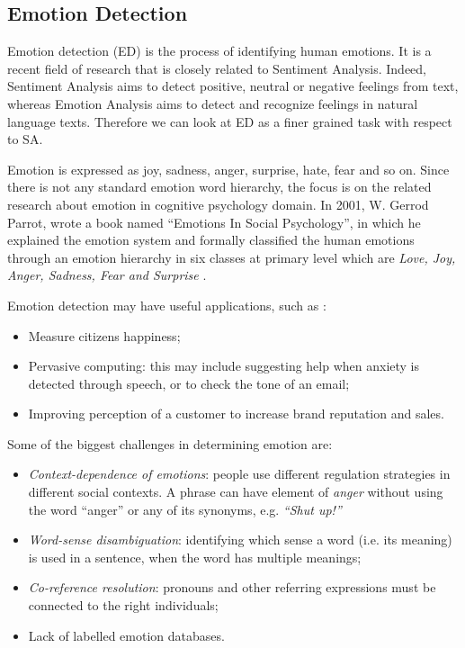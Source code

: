 \subsection{Emotion Detection}

Emotion detection (ED) is the process of identifying human emotions. It is a recent field of research that is closely related to Sentiment Analysis. Indeed, Sentiment Analysis aims to detect positive, neutral or negative feelings from text, whereas Emotion Analysis aims to detect and recognize feelings in natural language texts. Therefore we can look at ED as a finer grained task with respect to SA.\par
Emotion is expressed as joy, sadness, anger, surprise, hate, fear and so on. Since there is not any standard emotion word hierarchy, the focus is on the related research about emotion in cognitive psychology domain. In 2001, W. Gerrod Parrot, wrote a book named ``Emotions In Social Psychology''\cite{Parrott2016}, in which he explained the emotion system and formally classified the human emotions through an emotion hierarchy in six classes at primary level which are \textit{Love, Joy, Anger, Sadness, Fear and Surprise} \cite{edfromtext}.\par

Emotion detection may have useful applications, such as \cite{microsoft}: 
\begin{itemize}
\item Measure citizens happiness;
\item Pervasive computing: this may include suggesting help when anxiety is detected through speech, or to check the tone of an email; 
\item Improving perception of a customer to increase brand reputation and sales. 
\end{itemize}

Some of the biggest challenges in determining emotion are:
\begin{itemize}
\item \textit{Context-dependence of emotions}: people use different regulation strategies in different social contexts. A phrase can have element of \textit{anger} without using the word ``anger'' or any of its synonyms, e.g. \textit{``Shut up!''}
\item \textit{Word-sense disambiguation}: identifying which sense a word (i.e. its meaning) is used in a sentence, when the word has multiple meanings; 
\item \textit{Co-reference resolution}: pronouns and other referring expressions must be connected to the right individuals;
\item Lack of labelled emotion databases. 
\end{itemize}

